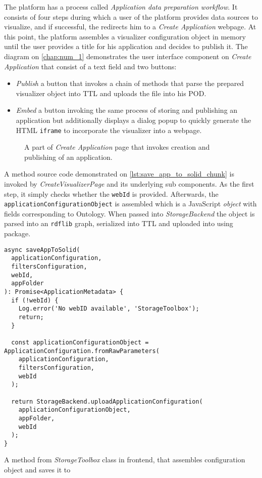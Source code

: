 The \lpa{} platform has a process called \textit{Application data preparation workflow}. It consists of four steps during which a user of the platform provides data sources to visualize, and if successful, the \lpa{} redirects him to a \textit{Create Application} webpage. At this point, the platform assembles a visualizer configuration object in memory until the user provides a title for his application and decides to publish it. The diagram on \autoref{chap:num_1} demonstrates the user interface component on \textit{Create Application} that consist of a text field and two buttons:
\begin{itemize}
    \item \textit{Publish} a button that invokes a chain of methods that parse the prepared visualizer object into TTL and uploads the file into his \solid{} POD.
    \item \textit{Embed} a button invoking the same process of storing and publishing an application but additionally displays a dialog popup to quickly generate the HTML \texttt{iframe} to incorporate the visualizer into a webpage.
\end{itemize}

\begin{figure}[h]
\centering
{}
\caption{A part of \textit{Create Application} page that invokes creation and publishing of an application.}
\label{fig:create_app_implementation_diagram}
\end{figure}

A method source code demonstrated on \autoref{lst:save_app_to_solid_chunk} is invoked by \textit{CreateVisualizerPage} and its underlying sub components. As the first step, it simply checks whether the \texttt{webId} is provided. Afterwards, the \texttt{applicationConfigurationObject} is assembled which is a JavaScript \textit{object} with fields corresponding to \lpas{} Ontology. When passed into \textit{StorageBackend} the object is parsed into an \texttt{rdflib} graph, serialized into TTL and uploaded into \solid{} using \lpas{} package.

\begin{listing}[H]    
\begin{verbatim}
async saveAppToSolid(
  applicationConfiguration,
  filtersConfiguration,
  webId,
  appFolder
): Promise<ApplicationMetadata> {
  if (!webId) {
    Log.error('No webID available', 'StorageToolbox');
    return;
  }

  const applicationConfigurationObject = ApplicationConfiguration.fromRawParameters(
    applicationConfiguration,
    filtersConfiguration,
    webId
  );

  return StorageBackend.uploadApplicationConfiguration(
    applicationConfigurationObject,
    appFolder,
    webId
  );
}
\end{verbatim}
\caption{A method from \textit{StorageToolbox} class in\lpa{} frontend, that assembles configuration object and saves it to \solid{}} 
\label{lst:save_app_to_solid_chunk}
\end{listing}

